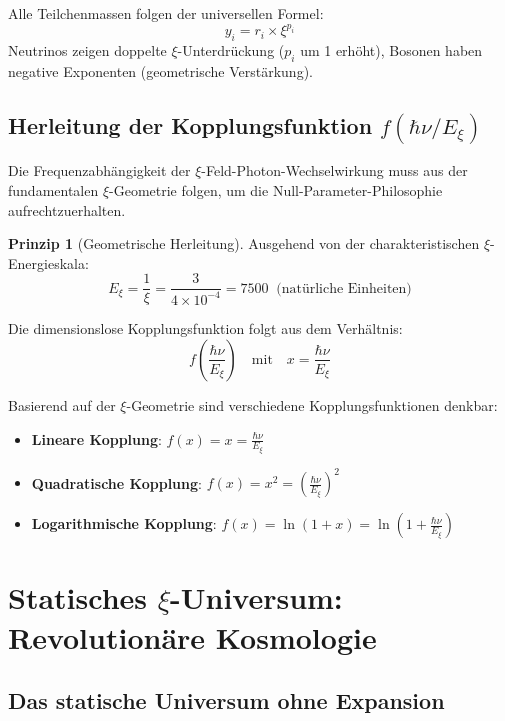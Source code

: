 \documentclass[12pt,a4paper]{article}
\newcommand{\Exi}{E_\xi}
\theoremstyle{definition}
\newtheorem{principle}{Prinzip}
\begin{document}
	\begin{important}
		Alle Teilchenmassen folgen der universellen Formel:
		\[\boxed{y_i = r_i \times \xi^{p_i}}\]
		Neutrinos zeigen doppelte $\xi$-Unterdrückung ($p_i$ um 1 erhöht), Bosonen haben negative Exponenten (geometrische Verstärkung).
	\end{important}
	
	\subsection{Herleitung der Kopplungsfunktion $f(\hbar\nu/\Exi)$}
	
	Die Frequenzabhängigkeit der $\xi$-Feld-Photon-Wechselwirkung muss aus der fundamentalen $\xi$-Geometrie folgen, um die Null-Parameter-Philosophie aufrechtzuerhalten.
	
	\begin{principle}[Geometrische Herleitung]
		Ausgehend von der charakteristischen $\xi$-Energieskala:
		\begin{equation}
			\Exi = \frac{1}{\xi} = \frac{3}{4 \times 10^{-4}} = \SI{7500}{} \text{ (natürliche Einheiten)}
		\end{equation}
		
		Die dimensionslose Kopplungsfunktion folgt aus dem Verhältnis:
		\begin{equation}
			f\left(\frac{\hbar\nu}{\Exi}\right) \quad \text{mit} \quad x = \frac{\hbar\nu}{\Exi}
		\end{equation}
	\end{principle}
	
	Basierend auf der $\xi$-Geometrie sind verschiedene Kopplungsfunktionen denkbar:
	\begin{itemize}
		\item \textbf{Lineare Kopplung}: $f(x) = x = \frac{\hbar\nu}{\Exi}$
		\item \textbf{Quadratische Kopplung}: $f(x) = x^2 = \left(\frac{\hbar\nu}{\Exi}\right)^2$
		\item \textbf{Logarithmische Kopplung}: $f(x) = \ln(1+x) = \ln\left(1+\frac{\hbar\nu}{\Exi}\right)$
	\end{itemize}
	
	\section{Statisches $\xi$-Universum: Revolutionäre Kosmologie}
	
	\subsection{Das statische Universum ohne Expansion}
	
\end{document}
